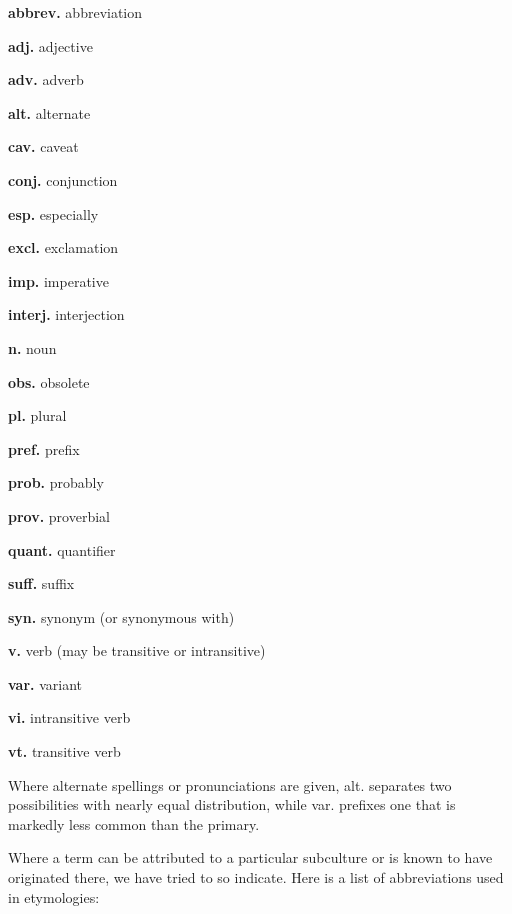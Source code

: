 \begin{multicols}{3}
	\textbf{abbrev.} abbreviation

	\textbf{adj.} adjective

	\textbf{adv.} adverb

	\textbf{alt.} alternate

	\textbf{cav.} caveat

	\textbf{conj.} conjunction

	\textbf{esp.} especially

	\textbf{excl.} exclamation

	\textbf{imp.} imperative

	\textbf{interj.} interjection

	\textbf{n.} noun

	\textbf{obs.} obsolete

	\textbf{pl.} plural

	\textbf{pref.} prefix

	\textbf{prob.} probably

	\textbf{prov.} proverbial

	\textbf{quant.} quantifier

	\textbf{suff.} suffix

	\textbf{syn.} synonym (or synonymous with)

	\textbf{v.} verb (may be transitive or intransitive)

	\textbf{var.} variant

	\textbf{vi.} intransitive verb

	\textbf{vt.} transitive verb
\end{multicols}

Where alternate spellings or pronunciations are given, alt. separates two possibilities with nearly equal distribution, while var. prefixes
one that is markedly less common than the primary.

Where a term can be attributed to a particular subculture or is known to have originated there, we have tried to so indicate. Here is a
list of abbreviations used in etymologies:

